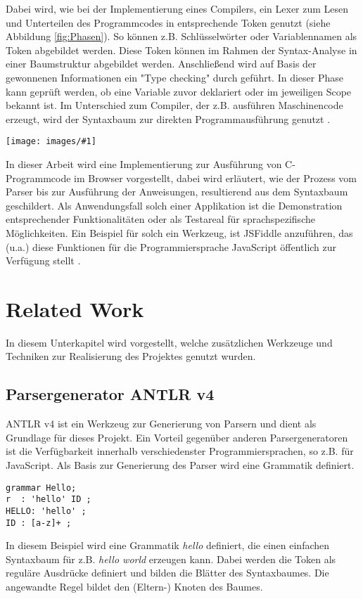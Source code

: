 \documentclass[]{lni}
\newcommand{\pic}[3]{
	\begin{figure*}
		\centering
		\texttt{[image: images/\#1]}
		\caption{#2}
		\label{fig:#3}       %
	\end{figure*}
}
\begin{document}
Dabei wird, wie bei der Implementierung eines Compilers, ein Lexer zum Lesen und Unterteilen des Programmcodes in entsprechende Token genutzt (siehe Abbildung \ref{fig:Phasen}). So können z.B. Schlüsselwörter oder Variablennamen als Token abgebildet werden. Diese Token können im Rahmen der Syntax-Analyse in einer Baumstruktur abgebildet werden. Anschließend wird auf Basis der gewonnenen Informationen ein "Type checking" durch geführt. In dieser Phase kann geprüft werden, ob eine Variable zuvor deklariert oder im jeweiligen Scope bekannt ist.
Im Unterschied zum Compiler, der z.B. ausführen Maschinencode erzeugt, wird der Syntaxbaum zur direkten Programmausführung genutzt \cite{mogensen}. 

\pic{pipeline.png}{Phasen des Compilerprogrammierung (Grafik entnommen aus \cite{Parr2009})}{Phasen}
\newpage
In dieser Arbeit wird eine Implementierung zur Ausführung von C-Programmcode im Browser vorgestellt, dabei wird erläutert, wie der Prozess vom Parser bis zur Ausführung der Anweisungen, resultierend aus dem Syntaxbaum geschildert. Als Anwendungsfall solch einer Applikation ist die Demonstration entsprechender Funktionalitäten oder als Testareal für sprachspezifische Möglichkeiten. Ein Beispiel für solch ein Werkzeug, ist JSFiddle  anzuführen, das (u.a.) diese Funktionen für die Programmiersprache JavaScript öffentlich zur Verfügung stellt \cite{fiddle}.

\section{Related Work}
In diesem Unterkapitel wird vorgestellt, welche zusätzlichen Werkzeuge und Techniken zur Realisierung des Projektes genutzt wurden.
\subsection{Parsergenerator ANTLR v4}
ANTLR v4 ist ein Werkzeug zur Generierung von Parsern \cite{Parr2013} und dient als Grundlage für dieses Projekt. Ein Vorteil gegenüber anderen Parsergeneratoren ist die Verfügbarkeit innerhalb verschiedenster Programmiersprachen, so z.B. für JavaScript. Als Basis zur Generierung des Parser wird eine Grammatik definiert.
\begin{lstlisting}
grammar Hello;
r  : 'hello' ID ;
HELLO: 'hello' ;
ID : [a-z]+ ;
\end{lstlisting}
In diesem Beispiel wird eine Grammatik \textit{hello} definiert, die einen einfachen Syntaxbaum für z.B. \textit{hello world} erzeugen kann. Dabei werden die Token als reguläre Ausdrücke definiert und bilden die Blätter des Syntaxbaumes. Die angewandte Regel bildet den (Eltern-) Knoten des Baumes.
\end{document}
